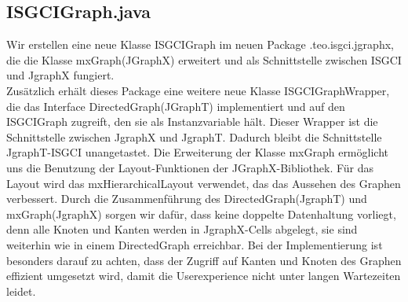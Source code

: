 \documentclass[10pt,a4paper]{article}
\begin{document}
\subsection{ISGCIGraph.java}
Wir erstellen eine neue Klasse ISGCIGraph im neuen Package .teo.isgci.jgraphx, die die Klasse mxGraph(JGraphX) erweitert und als Schnittstelle zwischen ISGCI und JgraphX fungiert.\\
Zusätzlich erhält dieses Package eine weitere neue Klasse ISGCIGraphWrapper, die das Interface DirectedGraph(JGraphT) implementiert und auf den ISGCIGraph zugreift, den sie als Instanzvariable hält. Dieser Wrapper ist die Schnittstelle zwischen JgraphX und JgraphT. Dadurch bleibt die Schnittstelle JgraphT-ISGCI unangetastet.
Die Erweiterung der Klasse mxGraph ermöglicht uns die Benutzung der Layout-Funktionen der JGraphX-Bibliothek. Für das Layout wird das mxHierarchicalLayout verwendet, das das Aussehen des Graphen verbessert. 
 Durch die Zusammenführung des DirectedGraph(JgraphT) und mxGraph(JgraphX) sorgen wir dafür, dass keine doppelte Datenhaltung vorliegt, denn alle Knoten und Kanten werden in JgraphX-Cells abgelegt, sie sind weiterhin wie in einem DirectedGraph erreichbar. Bei der Implementierung ist besonders darauf zu achten, dass der Zugriff auf Kanten und Knoten des Graphen effizient umgesetzt wird, damit die Userexperience nicht unter langen Wartezeiten leidet.
\end{document}
